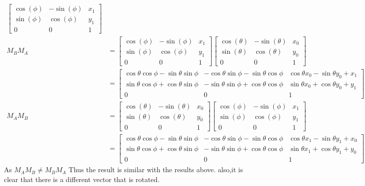 \documentclass{article}
\begin{document}
\begin{itemize}
\begin{itemize}
\begin{align*}
\begin{bmatrix}
                \cos(\phi)&-\sin(\phi)&x_1\\
                \sin(\phi)&\cos(\phi)&y_1\\
                0&0&1
            \end{bmatrix}\\
            M_BM_A &=\begin{bmatrix}
                \cos(\phi)&-\sin(\phi)&x_1\\
                \sin(\phi)&\cos(\phi)&y_1\\
                0&0&1
            \end{bmatrix}\begin{bmatrix}
                \cos(\theta)&-\sin(\theta)&x_0\\
                \sin(\theta)&\cos(\theta)&y_0\\
                0&0&1
            \end{bmatrix}\\
            &=\begin{bmatrix}
                \cos\theta \cos\phi - \sin\theta \sin\phi & -\cos\theta \sin\phi - \sin\theta \cos\phi & \cos\theta x_0 - \sin\theta y_0 + x_1 \\
                \sin\theta \cos\phi + \cos\theta \sin\phi & -\sin\theta \sin\phi + \cos\theta \cos\phi & \sin\theta x_0 + \cos\theta y_0 + y_1 \\
                0 & 0 & 1
                \end{bmatrix}\\
            M_AM_B &=\begin{bmatrix}
                \cos(\theta)&-\sin(\theta)&x_0\\
                \sin(\theta)&\cos(\theta)&y_0\\
                0&0&1
            \end{bmatrix}\begin{bmatrix}
                \cos(\phi)&-\sin(\phi)&x_1\\
                \sin(\phi)&\cos(\phi)&y_1\\
                0&0&1
            \end{bmatrix}\\
            &=\begin{bmatrix}
                \cos\theta \cos\phi - \sin\theta \sin\phi & -\cos\theta \sin\phi - \sin\theta \cos\phi & \cos\theta x_1 - \sin\theta y_1 + x_0 \\
                \sin\theta \cos\phi + \cos\theta \sin\phi & -\sin\theta \sin\phi + \cos\theta \cos\phi & \sin\theta x_1 + \cos\theta y_1 + y_0 \\
                0 & 0 & 1
                \end{bmatrix}
        \end{align*}
        As \(M_AM_B \neq M_BM_A\) Thus the result is similar with the results above. also,it is clear that there is a different vector that is rotated.
    \end{itemize}
\end{itemize}
\end{document}
